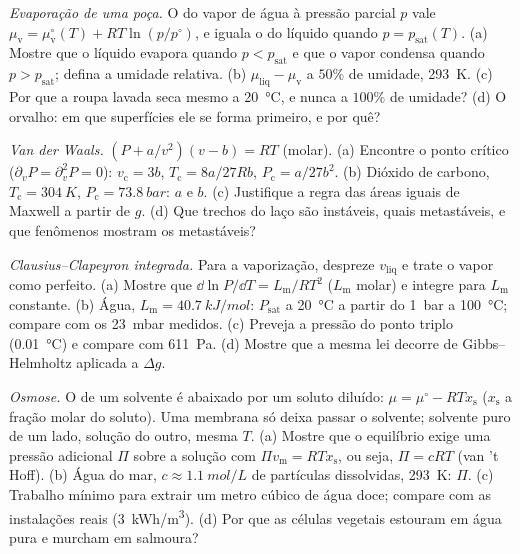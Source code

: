 \begin{exercise}[$\star\star$]\label{exo:b2:thermodynamic-potentials:8}
\emph{Evaporação de uma poça.} O  do vapor de água
à pressão parcial $p$ vale $\mu_{\text{v}} = \mu_{\text{v}}^\circ(T) +
RT\ln(p/p^\circ)$, e iguala o do líquido quando $p = p_{\text{sat}}(T)$.
(a) Mostre que o líquido evapora quando $p < p_{\text{sat}}$ e que o vapor
condensa quando $p > p_{\text{sat}}$; defina a umidade relativa. (b)
$\mu_{\text{liq}} - \mu_{\text{v}}$ a $50\%$ de umidade, \qty{293}{K}. (c) Por que
a roupa lavada seca mesmo a \qty{20}{\celsius}, e nunca a $100\%$ de umidade?
(d) O orvalho: em que superfícies ele se forma primeiro, e por quê?
\end{exercise}

\begin{exercise}[$\star\star$]\label{exo:b2:thermodynamic-potentials:9}
\emph{Van der Waals.} $(P + a/v^2)(v - b) = RT$ (molar). (a) Encontre o
ponto crítico ($\partial_vP = \partial_v^2P = 0$): $v_{\text{c}} = 3b$,
$T_{\text{c}} = 8a/27Rb$, $P_{\text{c}} = a/27b^2$. (b) Dióxido de carbono,
$T_{\text{c}} = \qty{304}{K}$, $P_{\text{c}} = \qty{73.8}{bar}$: $a$ e $b$. (c)
Justifique a regra das áreas iguais de Maxwell a partir de $g$. (d) Que trechos do laço
são instáveis, quais metastáveis, e que fenômenos mostram os
metastáveis?
\end{exercise}

\begin{exercise}[$\star\star\star$]\label{exo:b2:thermodynamic-potentials:10}
\emph{Clausius--Clapeyron integrada.} Para a vaporização, despreze $v_{\text{liq}}$
e trate o vapor como perfeito. (a) Mostre que $\dd\ln P/\dd T = L_{\text{m}}/RT^2$
($L_{\text{m}}$ molar) e integre para $L_{\text{m}}$ constante. (b) Água,
$L_{\text{m}} = \qty{40.7}{kJ/mol}$: $P_{\text{sat}}$ a \qty{20}{\celsius} a partir do
\qty{1}{bar} a \qty{100}{\celsius}; compare com os \qty{23}{mbar} medidos.
(c) Preveja a pressão do ponto triplo (\qty{0.01}{\celsius}) e compare
com \qty{611}{Pa}. (d) Mostre que a mesma lei decorre de Gibbs--Helmholtz
aplicada a $\Delta g$.
\end{exercise}

\begin{exercise}[$\star\star\star$]\label{exo:b2:thermodynamic-potentials:11}
\emph{Osmose.} O  de um solvente é abaixado por um
soluto diluído: $\mu = \mu^\circ - RTx_{\text{s}}$ ($x_{\text{s}}$ a fração
molar do soluto). Uma membrana só deixa passar o solvente; solvente puro de
um lado, solução do outro, mesma $T$. (a) Mostre que o equilíbrio
exige uma pressão adicional $\Pi$ sobre a solução com $\Pi v_{\text{m}} =
RTx_{\text{s}}$, ou seja, $\Pi = cRT$ (van 't Hoff). (b) Água do mar, $c \approx
\qty{1.1}{mol/L}$ de partículas dissolvidas, \qty{293}{K}: $\Pi$. (c) Trabalho mínimo
para extrair um metro cúbico de água doce; compare com as instalações reais
(\qty{3}{kWh/m^3}). (d) Por que as células vegetais estouram em água pura e
murcham em salmoura?
\end{exercise}

